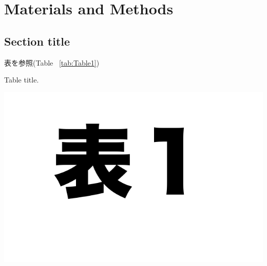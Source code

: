 \chapter{Materials and Methods}


\section{Section title}
表を参照(Table ~\ref{tab:Table1}) 
\begin{table}[H]
    \caption{Table title.}
    \includegraphics[width=1.0\textwidth]{img/Table1.pdf}
    \label{tab:Table1}
\end{table}


